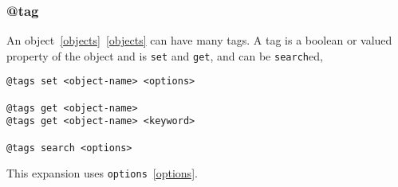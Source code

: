 \subsubsection{@tag}
\label{tag}

An object~\ref{objects}~\ref{objects} can have many tags. A tag is a boolean or valued property of the object and is \texttt{set} and \texttt{get}, and can be \texttt{search}ed,
%
\begin{verbatim}
@tags set <object-name> <options>

@tags get <object-name>
@tags get <object-name> <keyword>

@tags search <options>
\end{verbatim}
%
This expansion uses \texttt{options}~\ref{options}.